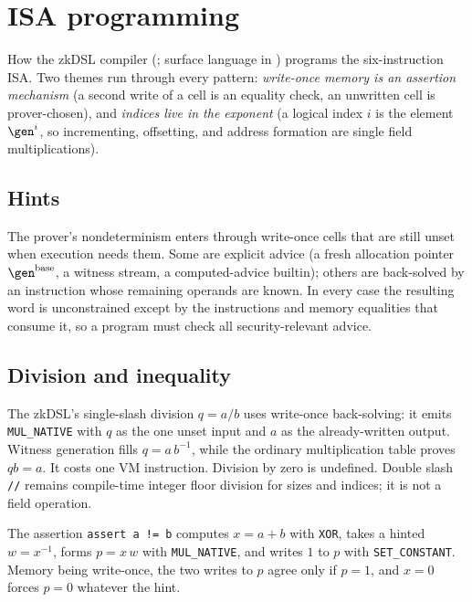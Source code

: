 \section{ISA programming}\label{sec:isa-programming}

How the zkDSL compiler (; surface language in ) programs the six-instruction ISA. Two themes run through every pattern: \emph{write-once memory is an assertion mechanism} (a second write of a cell is an equality check, an unwritten cell is prover-chosen), and \emph{indices live in the exponent} (a logical index $i$ is the element $\gen^{i}$, so incrementing, offsetting, and address formation are single field multiplications).

\subsection{Hints}\label{sec:prog-hints}

The prover's nondeterminism enters through write-once cells that are still unset when execution needs them. Some are explicit advice (a fresh allocation pointer $\gen^{\mathrm{base}}$, a witness stream, a computed-advice builtin); others are back-solved by an instruction whose remaining operands are known. In every case the resulting word is unconstrained except by the instructions and memory equalities that consume it, so a program must check all security-relevant advice.

\subsection{Division and inequality}\label{sec:prog-div-ne}

The zkDSL's single-slash division $q=a/b$ uses write-once back-solving: it emits \texttt{MUL\_NATIVE} with $q$ as the one unset input and $a$ as the already-written output. Witness generation fills $q=a\,b^{-1}$, while the ordinary multiplication table proves $q b=a$. It costs one VM instruction. Division by zero is undefined. Double slash \texttt{//} remains compile-time integer floor division for sizes and indices; it is not a field operation.

The assertion \texttt{assert a != b} computes $x=a+b$ with \texttt{XOR}, takes a hinted $w=x^{-1}$, forms $p=x\,w$ with \texttt{MUL\_NATIVE}, and writes $1$ to $p$ with \texttt{SET\_CONSTANT}. Memory being write-once, the two writes to $p$ agree only if $p=1$, and $x=0$ forces $p=0$ whatever the hint.

